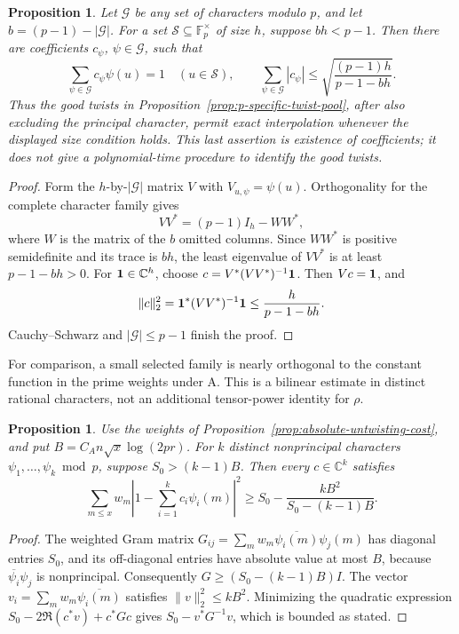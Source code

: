 \documentclass[11pt]{article}
\newtheorem{proposition}[theorem]{Proposition}
\theoremstyle{definition}
\theoremstyle{remark}
\begin{document}
\begin{proposition}\label{prop:good-twist-interpolation}
Let \(\mathcal G\) be any set of characters modulo \(p\), and let
\(b=(p-1)-|\mathcal G|\). For a set
\(\mathcal S\subseteq\mathbb F_p^\times\) of size \(h\), suppose
\(bh<p-1\). Then there are coefficients \(c_\psi\), \(\psi\in\mathcal G\),
such that
\[
 \sum_{\psi\in\mathcal G}c_\psi\psi(u)=1
 \quad(u\in\mathcal S),\qquad
 \sum_{\psi\in\mathcal G}|c_\psi|
 \leq \sqrt{\frac{(p-1)h}{p-1-bh}}.
\]
Thus the good twists in Proposition~\ref{prop:p-specific-twist-pool},
after also excluding the principal character, permit exact
interpolation whenever the displayed size condition holds.
This last assertion is existence of coefficients; it does not
give a polynomial-time procedure to identify the good twists.
\end{proposition}
\begin{proof}
Form the \(h\)-by-\(|\mathcal G|\) matrix \(V\) with
\(V_{u,\psi}=\psi(u)\). Orthogonality for the complete character
family gives
\[
 VV^*=(p-1)I_h-WW^*,
\]
where \(W\) is the matrix of the \(b\) omitted columns.
Since \(WW^*\) is positive semidefinite and its trace is \(bh\),
the least eigenvalue of \(VV^*\) is at least \(p-1-bh>0\).
For \({\bf 1}\in\mathbb C^h\), choose
\(c=V^*(VV^*)^{-1}{\bf 1}\). Then \(Vc={\bf 1}\), and
\[
 \|c\|_2^2={\bf 1}^*(VV^*)^{-1}{\bf 1}
 \leq\frac{h}{p-1-bh}.
\]
Cauchy--Schwarz and \(|\mathcal G|\leq p-1\) finish the proof.
\end{proof}

For comparison, a small selected family is nearly orthogonal to
the constant function in the prime weights under A.
This is a bilinear estimate in distinct rational characters,
not an additional tensor-power identity for \(\rho\).

\begin{proposition}\label{prop:bilinear-small-menu}
Use the weights of Proposition~\ref{prop:absolute-untwisting-cost},
and put \(B=C_A n\sqrt x\log(2pr)\).
For \(k\) distinct nonprincipal characters
\(\psi_1,\ldots,\psi_k\bmod p\), suppose \(S_0>(k-1)B\).
Then every \(c\in\mathbb C^k\) satisfies
\[
 \sum_{m\leq x}w_m
 \left|1-\sum_{i=1}^k c_i\psi_i(m)\right|^2
 \geq
 S_0-\frac{kB^2}{S_0-(k-1)B}.
\]
\end{proposition}
\begin{proof}
The weighted Gram matrix
\(G_{ij}=\sum_m w_m\overline{\psi_i(m)}\psi_j(m)\)
has diagonal entries \(S_0\), and its off-diagonal entries have
absolute value at most \(B\), because
\(\overline{\psi_i}\psi_j\) is nonprincipal.
Consequently \(G\geq(S_0-(k-1)B)I\).
The vector \(v_i=\sum_m w_m\overline{\psi_i(m)}\) satisfies
\(\|v\|_2^2\leq kB^2\).
Minimizing the quadratic expression
\(S_0-2\Re(c^*v)+c^*Gc\) gives
\(S_0-v^*G^{-1}v\), which is bounded as stated.
\end{proof}
\end{document}
